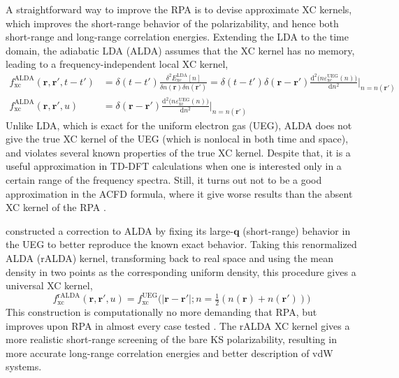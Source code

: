 A straightforward way to improve the RPA is to devise approximate XC kernels, which improves the short-range behavior of the polarizability, and hence both short-range and long-range correlation energies.
Extending the LDA to the time domain, the adiabatic LDA (ALDA) assumes that the XC kernel has no memory, leading to a frequency-independent local XC kernel,
\begin{equation}
\begin{aligned}
  f_\text{xc}^\text{ALDA}(\mathbf r,\mathbf r',t-t')&=\delta(t-t')\frac{\delta^2E_\text{xc}^\text{LDA}[n]}{\delta n(\mathbf r)\delta n(\mathbf r')}=\delta(t-t')\delta(\mathbf r-\mathbf r')\frac{\mathrm d^2\big(n\varepsilon_\text{xc}^\text{UEG}(n)\!\big)}{\mathrm d n^2}\bigg|_{n=n(\mathbf r')} \\
  f_\text{xc}^\text{ALDA}(\mathbf r,\mathbf r',u)&=\delta(\mathbf r-\mathbf r')\frac{\mathrm d^2\big(n\varepsilon_\text{xc}^\text{UEG}(n)\!\big)}{\mathrm d n^2}\bigg|_{n=n(\mathbf r')}
\end{aligned}
\end{equation}
Unlike LDA, which is exact for the uniform electron gas (UEG), ALDA does not give the true XC kernel of the UEG (which is nonlocal in both time and space), and violates several known properties of the true XC kernel.
Despite that, it is a useful approximation in TD-DFT calculations when one is interested only in a certain range of the frequency spectra.
Still, it turns out not to be a good approximation in the ACFD formula, where it give worse results than the absent XC kernel of the RPA \citep{LeinPRB00}.

\citet{OlsenPRB12} constructed a correction to ALDA by fixing its large-$\mathbf q$ (short-range) behavior in the UEG to better reproduce the known exact behavior.
Taking this renormalized ALDA (rALDA) kernel, transforming back to real space and using the mean density in two points as the corresponding uniform density, this procedure gives a universal XC kernel,
\begin{equation}
  f_\text{xc}^\text{rALDA}(\mathbf r,\mathbf r',u)=f_\text{xc}^\text{UEG}\big(|\mathbf r-\mathbf r'|;n=\tfrac12(n(\mathbf r)+n(\mathbf r')\!)\!\big)
\end{equation}
This construction is computationally no more demanding that RPA, but improves upon RPA in almost every case tested \citep{OlsenPRB13,OlsenPRL14}.
The rALDA XC kernel gives a more realistic short-range screening of the bare KS polarizability, resulting in more accurate long-range correlation energies and better description of vdW systems.

